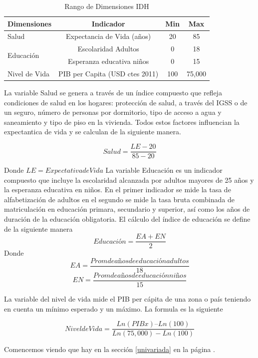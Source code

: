 \documentclass{article}
\begin{document}

\begin{table}[h!]
\centering
  \begin{tabular}{l c c c}
  \hline
  Dimensiones & Indicador & Min & Max \\ [0.25ex]
  \hline \hline
  Salud & Expectancia de Vida (años) & 20 & 85 \\
  \multirow{2}{*}{Educación} & Escolaridad Adultos & 0 & 18 \\ 
   & Esperanza educativa niños & 0 & 15 \\
  Nivel de Vida  & PIB per Capita (USD ctes 2011) & 100 & 75,000 \\
  \hline
  \end{tabular}
 \caption {Rango de Dimensiones IDH}
  \label{Tabla 1:}
\end {table} 

La variable Salud se genera a través de un índice compuesto que refleja condiciones de salud en los hogares: protección de salud, a través del IGSS o de un seguro, número de personas por dormitorio, tipo de acceso a agua y saneamiento y tipo de piso en la vivienda. Todos estos factores influencian la expectantica de vida y se calculan de la siguiente manera.

\[ Salud=\frac{LE-20} {85-20} \]

Donde $LE = Expectativa de Vida$
La variable Educación es un indicador compuesto que incluye la escolaridad alcanzada por adultos mayores de 25 años y la esperanza educativa en niños. En el primer indicador se mide la tasa de alfabetización de adultos en el segundo se mide la tasa bruta combinada de matriculación en educación primara, secundario y superior, así como los años de duración de la educación obligatoria. El cálculo del índice de educación se define de la siguiente manera
\[Educación= \frac{EA + EN} {2} \]
Donde
\[EA= \frac{Prom de años de educación adultos} {18}  \]
\[EN= \frac{Prom de años de educación niños} {15}  \]

La variable del nivel de vida mide el PIB per cápita de una zona o país teniendo en cuenta un mínimo esperado y un máximo. La formula es la siguiente

\[Nivel de Vida = \frac {Ln(PIBx) – Ln (100)} {Ln(75,000)-Ln(100)} \]





Comencemos viendo que hay en la sección \ref{univariada} en la página \pageref{univariada}.

\clearpage









\end{document}
